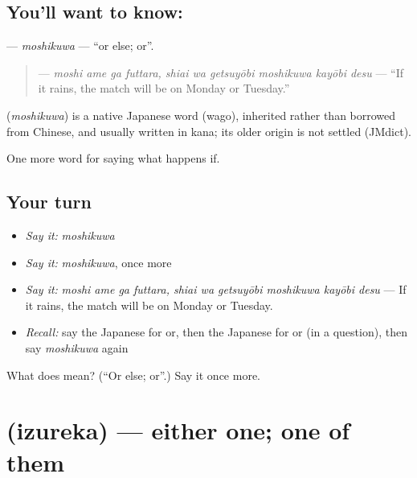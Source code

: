 \subsection*{You'll want to know: }
\textbf{} — \emph{moshikuwa} — \textquotedblleft{}or else; or\textquotedblright{}.

\begin{quote}
\textbf{     } — \emph{moshi ame ga futtara, shiai wa getsuyōbi moshikuwa kayōbi desu} — \textquotedblleft{}If it rains, the match will be on Monday or Tuesday.\textquotedblright{}
\end{quote}

\begin{cousinweb}
\textbf{} (\emph{moshikuwa}) is a native Japanese word (wago), inherited rather than borrowed from Chinese, and usually written in kana; its older origin is not settled (JMdict).
\end{cousinweb}

\begin{grammarlens}[title={What you've built}]
One more word for saying what happens if.
\end{grammarlens}

\subsection*{Your turn}
\begin{itemize}
\raggedright
  \item \emph{Say it:} \emph{moshikuwa}
  \item \emph{Say it:} \emph{moshikuwa}, once more
  \item \emph{Say it:} \emph{moshi ame ga futtara, shiai wa getsuyōbi moshikuwa kayōbi desu} — If it rains, the match will be on Monday or Tuesday.
  \item \emph{Recall:} say the Japanese for or, then the Japanese for or (in a question), then say \emph{moshikuwa} again
\end{itemize}

\begin{tcolorbox}[breakable,colback=teal!4,colframe=teal!35!black,title={Before you move on}]
What does  mean? (\textquotedblleft{}Or else; or\textquotedblright{}.) Say it once more.
\end{tcolorbox}
\section[\texorpdfstring{\ja{いずれか} (izureka)}{いずれか (izureka)}]{ (izureka) — either one; one of them}

